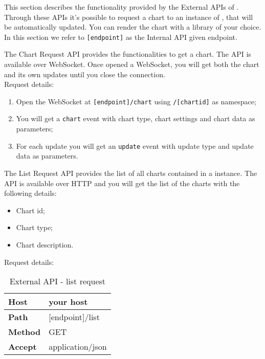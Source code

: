  \label{sec:ExternalAPI}
    This section describes the functionality provided by the External APIs of . Through these APIs it's possible to request a chart to an instance of , that will be automatically updated. You can render the chart with a library of your choice.\\
    In this section we refer to \texttt{[endpoint]} as the Internal API given endpoint.

        The Chart Request API provides the functionalities to get a chart. The API is available over WebSocket. Once opened a WebSocket, you will get both the chart and its own updates until you close the connection. \\
        Request details:
        \begin{enumerate}
            \item Open the WebSocket at \texttt{[endpoint]/chart} using \texttt{/[chartid]} as namespace;
            \item You will get a \texttt{chart} event with chart type, chart settings and chart data as parameters;
            \item For each update you will get an \texttt{update} event with update type and update data as parameters.
        \end{enumerate}

        The List Request API provides the list of all charts contained in a  instance. The API is available over HTTP and you will get the list of the charts with the following details:
        \begin{itemize}
            \item Chart id;
            \item Chart type;
            \item Chart description.
        \end{itemize}
        Request details:
        \begin{table}[H]
            \centering
            \begin{tabu}{|l|l|}
                \hline
                \textbf{Host} & your host \\ \hline
                \textbf{Path} & [endpoint]/list \\ \hline
                \textbf{Method} & GET \\ \hline
                \textbf{Accept} & application/json \\ \hline
            \end{tabu}
            \caption{External API - list request}
        \end{table}


